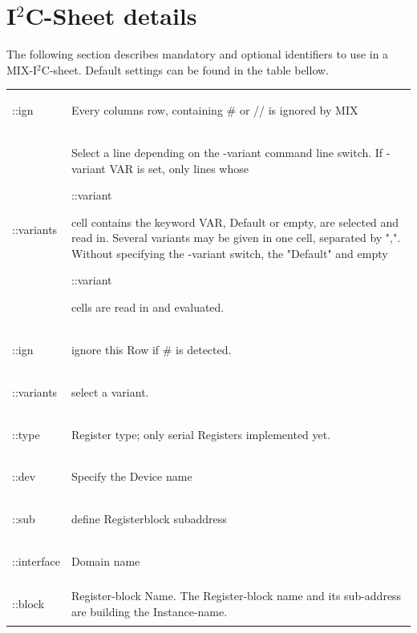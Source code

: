 \documentclass[a4paper,12pt]{report}
\begin{document}
\section{I$^2$C-Sheet details}
The following section describes mandatory and optional identifiers to use in a MIX-I$^2$C-sheet. Default settings can be found in the table bellow.
\begin{tabular}{lp{14cm}}
  \begin{bf}::ign\end{bf} & Every columns row, containing \# or // is ignored by MIX\\
  \begin{bf}::variants\end{bf} & Select a line depending on the -variant command line switch. If -variant VAR is set, only lines whose \begin{tt}::variant\end{tt} cell contains the keyword VAR, Default or empty, are selected and  read in. Several variants may be given in one cell, separated by ",". Without specifying the -variant switch, the "Default" and empty \begin{tt}::variant\end{tt} cells are read in and evaluated.\\
  \begin{bf}::ign\end{bf} & ignore this Row if \# is detected.\\
  \begin{bf}::variants\end{bf} & select a variant.\\
  \begin{bf}::type\end{bf} & Register type; only serial Registers implemented yet.\\
  \begin{bf}::dev\end{bf} & Specify the Device name\\
  \begin{bf}::sub\end{bf} & define Registerblock subaddress\\
  \begin{bf}::interface\end{bf} & Domain name\\
  \begin{bf}::block\end{bf} & Register-block Name. The Register-block name and its sub-address are building the Instance-name.\\

\end{tabular}
\end{document}
